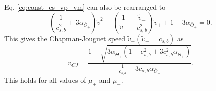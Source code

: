 Eq. \eqref{eq:const_cs_vp_vm} can also be rearranged to
\begin{equation}
\left( \frac{1}{c_{s,b}^2} + 3\alpha_{\bar{\Theta}_+} \right) \tilde{v}_+^2
- \left( \frac{1}{\tilde{v}_-} + \frac{\tilde{v}_-}{c_{s,b}^2} \right) \tilde{v}_+
+ 1 - 3\alpha_{\bar{\Theta}_+}
= 0.
\end{equation}
This gives the Chapman-Jouguet speed $\tilde{v}_+ \left( \tilde{v}_- = c_{s,b} \right)$ as
\cite[eq. 55]{giese_2020}
\begin{equation}
v_{CJ} = \frac{ 1 + \sqrt{ 3\alpha_{\bar{\Theta}_+} ( 1 - c_{s,b}^2 + 3 c_{s,b}^2 \alpha_{\bar{\Theta}_+} ) }}{ \frac{1}{c_{s,b}} + 3 c_{s,b} \alpha_{\bar{\Theta}_+}}.
\end{equation}
This holds for all values of $\mu_+$ and $\mu_-$.
